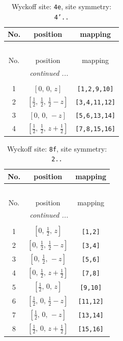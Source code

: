 \documentclass[fleqn,8pt]{jsarticle}
\begin{document}
\renewcommand{\arraystretch}{1.2}
\begin{longtable}{ccc}
\caption{Wyckoff site: {\tt 4e}, site symmetry: {\tt 4'..}}
 \\
 \hline \hline
No. & position & mapping \\ \hline \endfirsthead

\multicolumn{2}{l}{\tablename\ \thetable{}} \\
 \hline \hline
No. & position & mapping \\ \hline \endhead

 \hline \hline
\multicolumn{2}{r}{\footnotesize\it continued ...} \\ \endfoot

 \hline \hline
\multicolumn{2}{r}{} \\ \endlastfoot

1 & $\left[ 0,\, 0,\, z \right]$ & {\tt [1,2,9,10]} \\ \hline
2 & $\left[ \frac{1}{2},\, \frac{1}{2},\, \frac{1}{2} - z \right]$ & {\tt [3,4,11,12]} \\ \hline
3 & $\left[ 0,\, 0,\, - z \right]$ & {\tt [5,6,13,14]} \\ \hline
4 & $\left[ \frac{1}{2},\, \frac{1}{2},\, z + \frac{1}{2} \right]$ & {\tt [7,8,15,16]} \\
\end{longtable}
\renewcommand{\arraystretch}{1.2}
\begin{longtable}{ccc}
\caption{Wyckoff site: {\tt 8f}, site symmetry: {\tt 2..}}
 \\
 \hline \hline
No. & position & mapping \\ \hline \endfirsthead

\multicolumn{2}{l}{\tablename\ \thetable{}} \\
 \hline \hline
No. & position & mapping \\ \hline \endhead

 \hline \hline
\multicolumn{2}{r}{\footnotesize\it continued ...} \\ \endfoot

 \hline \hline
\multicolumn{2}{r}{} \\ \endlastfoot

1 & $\left[ 0,\, \frac{1}{2},\, z \right]$ & {\tt [1,2]} \\ \hline
2 & $\left[ 0,\, \frac{1}{2},\, \frac{1}{2} - z \right]$ & {\tt [3,4]} \\ \hline
3 & $\left[ 0,\, \frac{1}{2},\, - z \right]$ & {\tt [5,6]} \\ \hline
4 & $\left[ 0,\, \frac{1}{2},\, z + \frac{1}{2} \right]$ & {\tt [7,8]} \\ \hline
5 & $\left[ \frac{1}{2},\, 0,\, z \right]$ & {\tt [9,10]} \\ \hline
6 & $\left[ \frac{1}{2},\, 0,\, \frac{1}{2} - z \right]$ & {\tt [11,12]} \\ \hline
7 & $\left[ \frac{1}{2},\, 0,\, - z \right]$ & {\tt [13,14]} \\ \hline
8 & $\left[ \frac{1}{2},\, 0,\, z + \frac{1}{2} \right]$ & {\tt [15,16]} \\
\end{longtable}
\end{document}
